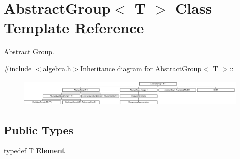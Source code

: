 \hypertarget{class_abstract_group}{
\section{AbstractGroup$<$ T $>$ Class Template Reference}
\label{class_abstract_group}
}


Abstract Group.  


{\ttfamily \#include $<$algebra.h$>$}Inheritance diagram for AbstractGroup$<$ T $>$::\begin{figure}[H]
\begin{center}
\leavevmode
\includegraphics[height=1.32388cm]{class_abstract_group}
\end{center}
\end{figure}
\subsection*{Public Types}
\begin{DoxyCompactItemize}
\item 
\hypertarget{class_abstract_group_a4a2b3308fb5c13f70fcc5746be52ba7b}{
typedef T {\bfseries Element}}
\label{class_abstract_group_a4a2b3308fb5c13f70fcc5746be52ba7b}

\end{DoxyCompactItemize}
